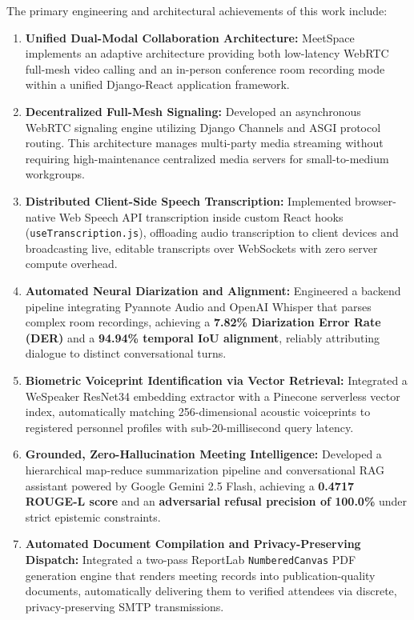 \documentclass[12pt,oneside,letterpaper]{report}
\numberwithin{equation}{chapter} %
\begin{document}
The primary engineering and architectural achievements of this work include:
\begin{enumerate}
    \item \textbf{Unified Dual-Modal Collaboration Architecture:} MeetSpace implements an adaptive architecture providing both low-latency WebRTC full-mesh video calling and an in-person conference room recording mode within a unified Django-React application framework.
    \item \textbf{Decentralized Full-Mesh Signaling:} Developed an asynchronous WebRTC signaling engine utilizing Django Channels and ASGI protocol routing. This architecture manages multi-party media streaming without requiring high-maintenance centralized media servers for small-to-medium workgroups.
    \item \textbf{Distributed Client-Side Speech Transcription:} Implemented browser-native Web Speech API transcription inside custom React hooks (\texttt{useTranscription.js}), offloading audio transcription to client devices and broadcasting live, editable transcripts over WebSockets with zero server compute overhead.
    \item \textbf{Automated Neural Diarization and Alignment:} Engineered a backend pipeline integrating Pyannote Audio and OpenAI Whisper that parses complex room recordings, achieving a \textbf{7.82\% Diarization Error Rate (DER)} and a \textbf{94.94\% temporal IoU alignment}, reliably attributing dialogue to distinct conversational turns.
    \item \textbf{Biometric Voiceprint Identification via Vector Retrieval:} Integrated a WeSpeaker ResNet34 embedding extractor with a Pinecone serverless vector index, automatically matching 256-dimensional acoustic voiceprints to registered personnel profiles with sub-20-millisecond query latency.
    \item \textbf{Grounded, Zero-Hallucination Meeting Intelligence:} Developed a hierarchical map-reduce summarization pipeline and conversational RAG assistant powered by Google Gemini 2.5 Flash, achieving a \textbf{0.4717 ROUGE-L score} and an \textbf{adversarial refusal precision of 100.0\%} under strict epistemic constraints.
    \item \textbf{Automated Document Compilation and Privacy-Preserving Dispatch:} Integrated a two-pass ReportLab \texttt{NumberedCanvas} PDF generation engine that renders meeting records into publication-quality documents, automatically delivering them to verified attendees via discrete, privacy-preserving SMTP transmissions.
\end{enumerate}
\end{document}
